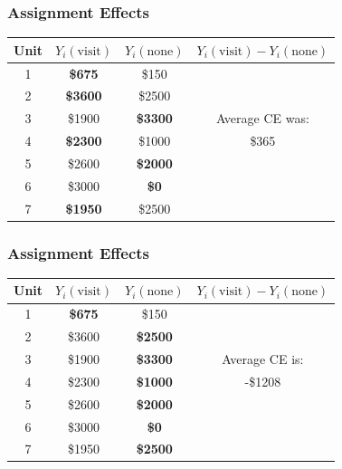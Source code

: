 \documentclass[aspectratio=169]{beamer}
\theoremstyle{principle}
\begin{document}
\begin{frame}
\frametitle{Assignment Effects}
\huge
\begin{table}
\begin{tabular}{ c | c | c | c}
Unit & $Y_i(\mbox{visit})$ & $Y_i(\mbox{none})$ & \color{white}$Y_i(\mbox{visit}) - Y_i(\mbox{none})$ \\
\hline
\hline
  1 & \textbf{\$675} & \color{gray}\$150 & \\
  2 & \textbf{\$3600} & \color{gray}\$2500 & \\
  3 & \color{gray}\$1900 & \textbf{\$3300} &Average CE was: \\
  4 & \textbf{\$2300} & \color{gray}\$1000 & \$365\\
  5 & \color{gray}\$2600 & \textbf{\$2000} & \\
  6 & \color{gray}\$3000 & \textbf{\$0} & \\
  7 & \textbf{\$1950} & \color{gray}\$2500 & \\
\hline
\hline
\end{tabular}
\end{table}

\end{frame}

\begin{frame}
\frametitle{Assignment Effects}
\huge
\begin{table}
\begin{tabular}{ c | c | c | c}
Unit & $Y_i(\mbox{visit})$ & $Y_i(\mbox{none})$ & \color{white}$Y_i(\mbox{visit}) - Y_i(\mbox{none})$ \\
\hline
\hline
  1 & \textbf{\$675} & \color{gray}\$150 & \\
  2 & \color{gray}\$3600 & \textbf{\$2500} & \\
  3 & \color{gray}\$1900 & \textbf{\$3300} &Average CE is: \\
  4 & \color{gray}\$2300 & \textbf{\$1000} & -\$1208\\
  5 & \color{gray}\$2600 & \textbf{\$2000} & \\
  6 & \color{gray}\$3000 & \textbf{\$0} & \\
  7 & \color{gray}\$1950 & \textbf{\$2500} & \\
\hline
\hline
\end{tabular}
\end{table}

\end{frame}
\end{document}
